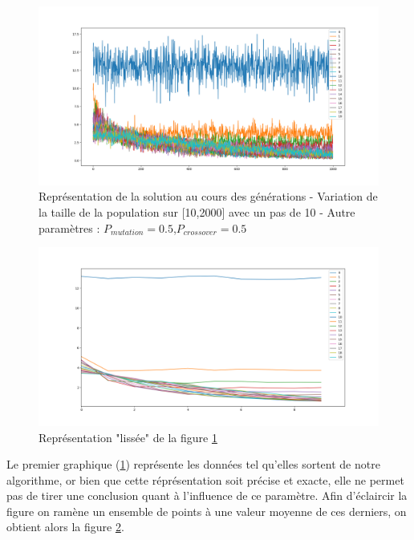 \documentclass[12pt]{report}
\begin{document}
        \begin{figure}[h]
          \centering
          \includegraphics[width=18cm]{img/evo_pop_size_brut.png}
          \caption{Représentation de la solution au cours des générations - Variation de la taille de la population sur [10,2000] avec un pas de 10 - Autre paramètres : $P_{mutation} = 0.5$,$P_{crossover} = 0.5$}
          \label{evo_pop_size_brut}
        \end{figure}

        \begin{figure}[!]
          \centering
          \includegraphics[width=18cm]{img/evo_pop_size_moy.png}
          \caption{Représentation "lissée" de la figure \ref{evo_pop_size_brut}}
          \label{evo_pop_size_moy}
        \end{figure}

        Le premier graphique (\ref{evo_pop_size_brut}) représente les données tel qu'elles sortent de notre algorithme, or bien que cette réprésentation soit précise et exacte, elle ne permet pas de tirer une conclusion quant à l'influence de ce paramètre. Afin d'éclaircir la figure on ramène un ensemble de points à une valeur moyenne de ces derniers, on obtient alors la figure \ref{evo_pop_size_moy}. \\
\end{document}
